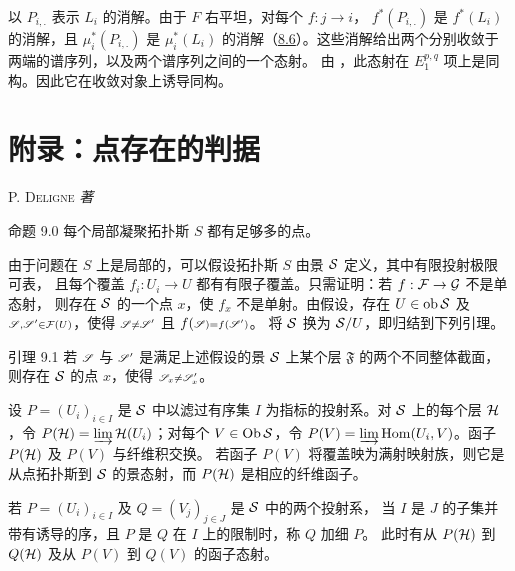 \noindent
以 $P_{i,.}$ 表示 $L_i$ 的消解。由于 $F$ 右平坦，对每个 $f:j\to i$，
$f^{\ast}(P_{i,.})$ 是 $f^{\ast}(L_i)$ 的消解，且 $\mu_i^{\ast}(P_{i,.})$ 是
$\mu_i^{\ast}(L_i)$ 的消解（\hyperref[VI.subsec8.6]{8.6}）。这些消解给出两个分别收敛于
 两端的谱序列，以及两个谱序列之间的一个态射。
由 ，此态射在 $E_1^{p,q}$ 项上是同构。因此它在收敛对象上诱导同构。




\section{附录：点存在的判据}

\centerline{P. \textsc{Deligne} \textit{著}}

\medskip
\begin{enonce*}{命题 9.0}
每个局部凝聚拓扑斯 $S$ 都有足够多的点。
\end{enonce*}

由于问题在 $S$ 上是局部的，可以假设拓扑斯 $S$ 由景 $\Ss$ 定义，其中有限投射极限可表，
且每个覆盖 $f_i:U_i\to U$ 都有有限子覆盖。只需证明：若 $f:\Ff\to\Gg$ 不是单态射，
则存在 $\Ss$ 的一个点 $x$，使 $f_x$ 不是单射。由假设，存在 $U\in\ob\Ss$ 及
$\ss,\ss'\in\Ff(U)$，使得 $\ss\ne\ss'$ 且 $f(\ss)=f(\ss')$。
将 $\Ss$ 换为 $\Ss/U$，即归结到下列引理。

\begin{enonce*}{引理 9.1}
若\pageoriginale{} $\ss$ 与 $\ss'$ 是满足上述假设的景 $\Ss$ 上某个层 $\mathfrak F$ 的两个不同整体截面，
则存在 $\Ss$ 的点 $x$，使得 $\ss_x\ne\ss'_x$。
\end{enonce*}

设 $P=(U_i)_{i\in I}$ 是 $\Ss$ 中以滤过有序集 $I$ 为指标的投射系。对 $\Ss$ 上的每个层
$\Hh$，令 $P(\Hh)=\varinjlim\Hh(U_i)$；对每个 $V\in\Ob\Ss$，令
$P(V)=\varinjlim\Hom(U_i,V)$。函子 $P(\Hh)$ 及 $P(V)$ 与纤维积交换。
若函子 $P(V)$ 将覆盖映为满射映射族，则它是从点拓扑斯到 $\Ss$ 的景态射，而
$P(\Hh)$ 是相应的纤维函子。

若 $P=(U_i)_{i\in I}$ 及 $Q=(V_j)_{j\in J}$ 是 $\Ss$ 中的两个投射系，
当 $I$ 是 $J$ 的子集并带有诱导的序，且 $P$ 是 $Q$ 在 $I$ 上的限制时，称 $Q$ 加细 $P$。
此时有从 $P(\Hh)$ 到 $Q(\Hh)$ 及从 $P(V)$ 到 $Q(V)$ 的函子态射。

